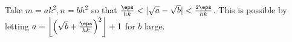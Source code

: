 Take $m=ak^2,n=bh^2$ so that $\frac{\eps}{hk}<|\sqrt{a}-\sqrt{b}|<\frac{2\eps}{hk}$. This is possible by letting $a=\left\lfloor\left(\sqrt{b}+\frac{\eps}{hk}\right)^2\right\rfloor+1$ for $b$ large.